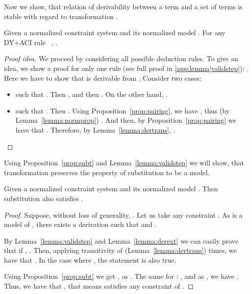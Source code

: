 Now we show, that relation of derivability between a term and a set of terms is stable with regard to transformation . 

\begin{lemma}\label{lemma:validstep}
Given a normalized constraint system  and its normalized model .
For any DY+ACI rule \ , \br .


\begin{proof}[Proof idea] 
We proceed by considering all possible deduction rules. To give an idea, we show a proof for only one rule (see full proof in \ref{app:lemma|validstep}):
  	. Here we have to show that  is derivable from .
	Consider two cases:
  	\begin{itemize}
		\item  such that . Then \br , \br and then 
		 \br . \br
		On the other hand,  \br .
		
		\item  such that . 
		 Then \br . Using Proposition~\ref{prop:pairing}, we have , thus (by Lemma~\ref{lemma:normprop}) . And then, by Proposition~\ref{prop:pairing} we have that . Therefore, by Lemma~\ref{lemma:dertrans},   .
	\end{itemize}
\end{proof}

\end{lemma}

Using Proposition~\ref{prop:subt} and Lemma~\ref{lemma:validstep} we will show, that transformation  preserves the property of substitution to be a model. 

\begin{theorem}\label{theorem:solution}
Given a normalized constraint system  and its normalized model .
Then substitution  also satisfies .
 \begin{proof}
 Suppose, without loss of generality, .
  Let us take any constraint . As  is a model of ,  there exists a derivation   such that  and . 

By Lemma~\ref{lemma:validstep} and Lemma~\ref{lemma:derext} we can easily prove that if , . 
Then, applying transitivity of  (Lemma~\ref{lemma:dertrans})  times, we have that . In the case where , the statement  is also true.


 Using Proposition~\ref{prop:subt} we get , as . The same for : , and as , we have . 
Thus, we have that , that means  satisfies any constraint of . 

 \end{proof}
\end{theorem}

